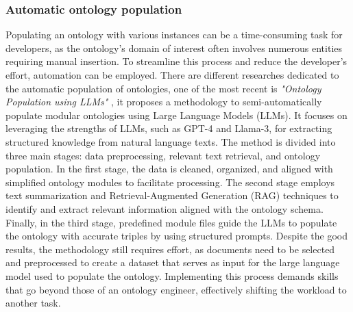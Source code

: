 \subsubsection{Automatic ontology population}
Populating an ontology with various instances can be a time-consuming task for developers, as the ontology's domain of interest often involves numerous entities requiring manual insertion. To streamline this process and reduce the developer's effort, automation can be employed. There are different researches dedicated to the automatic population of ontologies, one of the most recent is \textit{"Ontology Population using LLMs"} \cite{norouzi2024ontology}, it proposes a methodology to semi-automatically populate modular ontologies using Large Language Models (LLMs). It focuses on leveraging the strengths of LLMs, such as GPT-4 and Llama-3, for extracting structured knowledge from natural language texts. The method is divided into three main stages: data preprocessing, relevant text retrieval, and ontology population. In the first stage, the data is cleaned, organized, and aligned with simplified ontology modules to facilitate processing. The second stage employs text summarization and Retrieval-Augmented Generation (RAG) techniques to identify and extract relevant information aligned with the ontology schema. Finally, in the third stage, predefined module files guide the LLMs to populate the ontology with accurate triples by using structured prompts. Despite the good results, the methodology still requires effort, as documents need to be selected and preprocessed to create a dataset that serves as input for the large language model used to populate the ontology. Implementing this process demands skills that go beyond those of an ontology engineer, effectively shifting the workload to another task.\\ 
